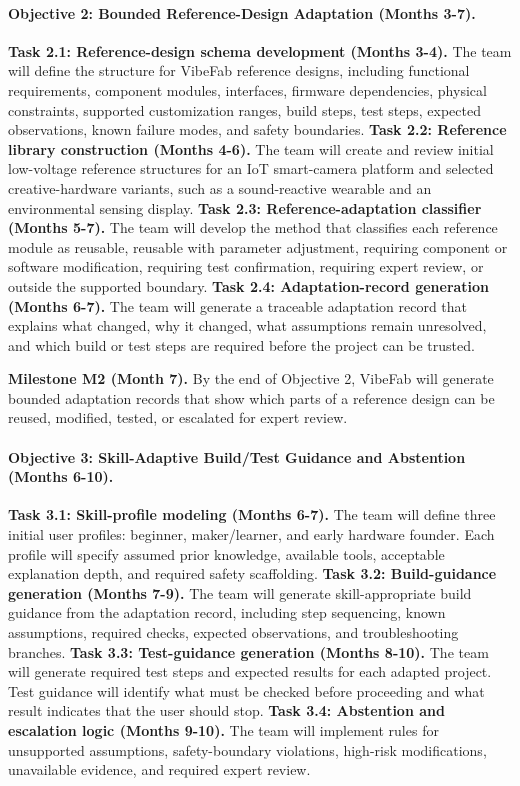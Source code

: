 \paragraph{Objective 2: Bounded Reference-Design Adaptation (Months 3-7).}
\textbf{Task 2.1: Reference-design schema development (Months 3-4).}
The team will define the structure for VibeFab reference designs, including functional requirements, component modules, interfaces, firmware dependencies, physical constraints, supported customization ranges, build steps, test steps, expected observations, known failure modes, and safety boundaries.
\textbf{Task 2.2: Reference library construction (Months 4-6).}
The team will create and review initial low-voltage reference structures for an IoT smart-camera platform and selected creative-hardware variants, such as a sound-reactive wearable and an environmental sensing display.
\textbf{Task 2.3: Reference-adaptation classifier (Months 5-7).}
The team will develop the method that classifies each reference module as reusable, reusable with parameter adjustment, requiring component or software modification, requiring test confirmation, requiring expert review, or outside the supported boundary.
\textbf{Task 2.4: Adaptation-record generation (Months 6-7).}
The team will generate a traceable adaptation record that explains what changed, why it changed, what assumptions remain unresolved, and which build or test steps are required before the project can be trusted.

\textbf{Milestone M2 (Month 7).}
By the end of Objective 2, VibeFab will generate bounded adaptation records that show which parts of a reference design can be reused, modified, tested, or escalated for expert review.

\vspace{-10pt}
\paragraph{Objective 3: Skill-Adaptive Build/Test Guidance and Abstention (Months 6-10).}
\textbf{Task 3.1: Skill-profile modeling (Months 6-7).}
The team will define three initial user profiles: beginner, maker/learner, and early hardware founder. Each profile will specify assumed prior knowledge, available tools, acceptable explanation depth, and required safety scaffolding.
\textbf{Task 3.2: Build-guidance generation (Months 7-9).}
The team will generate skill-appropriate build guidance from the adaptation record, including step sequencing, known assumptions, required checks, expected observations, and troubleshooting branches.
\textbf{Task 3.3: Test-guidance generation (Months 8-10).}
The team will generate required test steps and expected results for each adapted project. Test guidance will identify what must be checked before proceeding and what result indicates that the user should stop.
\textbf{Task 3.4: Abstention and escalation logic (Months 9-10).}
The team will implement rules for unsupported assumptions, safety-boundary violations, high-risk modifications, unavailable evidence, and required expert review.

